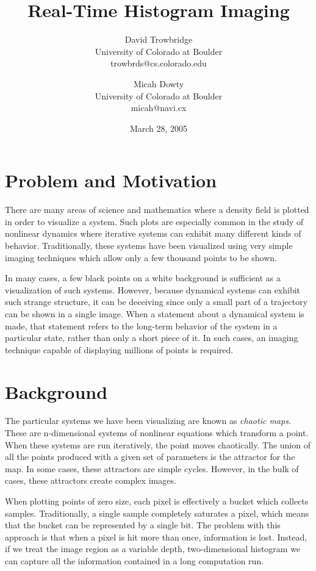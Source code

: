 \documentclass[letterpaper, 12pt]{article}
\title{Real-Time Histogram Imaging}
\author{
	David Trowbridge \\ University of Colorado at Boulder \\ trowbrds@cs.colorado.edu
\and
	Micah Dowty \\ University of Colorado at Boulder \\ micah@navi.cx
}
\date{March 28, 2005}
\begin{document}
\maketitle

\section{Problem and Motivation}
There are many areas of science and mathematics where a density field is plotted in order
to visualize a system.  Such plots are especially common in the study of nonlinear dynamics
where iterative systems can exhibit many different kinds of behavior.  Traditionally, these
systems have been visualized using very simple imaging techniques which allow only a few
thousand points to be shown.

In many cases, a few black points on a white background is sufficient as a visualization
of such systems.  However, because dynamical systems can exhibit such strange structure,
it can be deceiving since only a small part of a trajectory can be shown in a single image.
When a statement about a dynamical system is made, that statement refers to the long-term
behavior of the system in a particular state, rather than only a short piece of it.  In such
cases, an imaging technique capable of displaying millions of points is required.

\section{Background}
The particular systems we have been visualizing are known as \emph{chaotic maps}.  These are
n-dimensional systems of nonlinear equations which transform a point.  When these systems are
run iteratively, the point moves chaotically.  The union of all the points produced with a given
set of parameters is the attractor for the map.  In some cases, these attractors are simple
cycles.  However, in the bulk of cases, these attractors create complex images.

When plotting points of zero size, each pixel is effectively a bucket which collects samples.
Traditionally, a single sample completely saturates a pixel, which means that the bucket
can be represented by a single bit.  The problem with this approach is that when a pixel is
hit more than once, information is lost.  Instead, if we treat the image region as a variable
depth, two-dimensional histogram we can capture all the information contained in a long
computation run.
\end{document}
